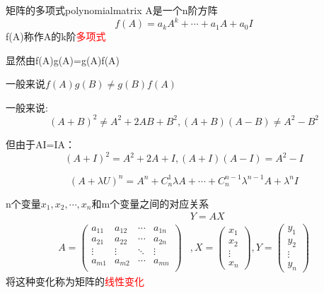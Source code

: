 \begin{definition}{矩阵的多项式}{polynomialmatrix}
	A是一个n阶方阵
	$$
	f(A)=a_kA^k+\cdots+a_1A+a_0I
	$$
	f(A)称作A的k阶\textcolor{red}{多项式}

	显然由f(A)g(A)=g(A)f(A)

	一般来说$f(A)g(B)\neq g(B)f(A)$

	一般来说:
	$$
	(A+B)^2\neq A^2+2AB+B^2
	,(A+B)(A-B)\neq A^2-B^2
	$$

	但由于AI=IA：
	$$
	(A+I)^2= A^2+2A+I
	,(A+I)(A-I)= A^2-I
	$$

	$$(A+\lambda U)^n=A^n+C_n^1\lambda A+\cdots+C_n^{n-1}\lambda^{n-1}A+\lambda^n I$$
\end{definition}

n个变量$x_1,x_2,\cdots,x_n$和m个变量之间的对应关系
\begin{equation*}
	\begin{aligned}
	&Y=AX\\
	A=\begin{pmatrix}
			a_{11} &a_{12}&\cdots&a_{1n}\\
		a_{21}&a_{22}&\cdots&a_{2n}\\
		\vdots&\vdots&\ddots&\vdots\\
		a_{m1}&a_{m2}&\cdots&a_{mn}\\
	\end{pmatrix}
	&,X=\begin{pmatrix}
	x_1\\x_2\\\vdots\\x_n
	\end{pmatrix}
	,Y=\begin{pmatrix}
	y_1\\y_2\\\vdots\\y_n
	\end{pmatrix}
	\end{aligned}
\end{equation*}
将这种变化称为矩阵的\textcolor{red}{线性变化}

